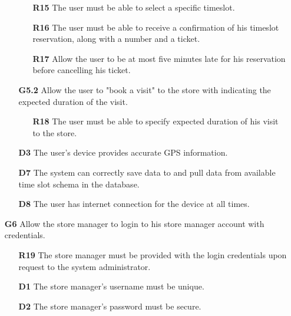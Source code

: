\begin{enumerate}
\begin{enumerate}
\begin{enumerate}
			\item [\textbf{R15}] The user must be able to select a specific timeslot.
			\item [\textbf{R16}] The user must be able to receive a confirmation of his timeslot reservation, along with a number and a ticket.
			\item [\textbf{R17}] Allow the user to be at most five minutes late for his reservation before cancelling his ticket.
		\end{enumerate}
		\item [\textbf{G5.2}] Allow the user to "book a visit" to the store with indicating the expected duration of the visit.
		\begin{enumerate}
			\item [\textbf{R18}] The user must be able to specify expected duration of his visit to the store.
		\end{enumerate}
 		\item [\textbf{D3}] The user's device provides accurate GPS information.
		\item [\textbf{D7}] The system can correctly save data to and pull data from available time slot schema in the database. 
		\item [\textbf{D8}] The user has internet connection for the device at all times.
	\end{enumerate}
	\item [\textbf{G6}] Allow the store manager to login to his store manager account with credentials.
	\begin{enumerate}
		\item [\textbf{R19}] The store manager must be provided with the login credentials upon request to the system administrator.
		\item [\textbf{D1}] The store manager's username must be unique. 
		\item [\textbf{D2}] The store manager's password must be secure. 
	\end{enumerate}
\end{enumerate}

